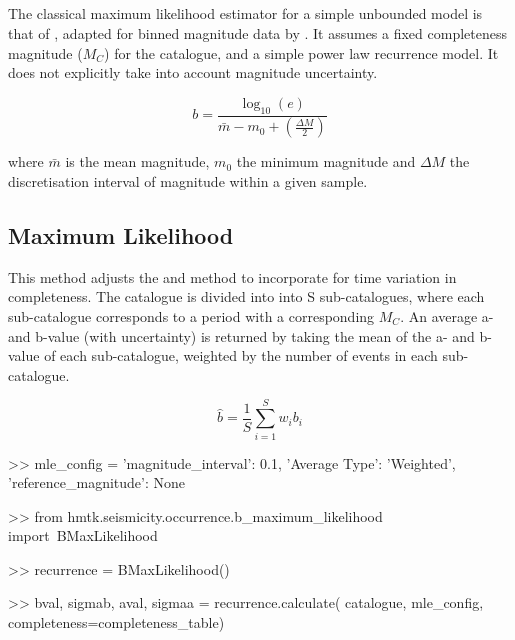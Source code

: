 \subsection{\textcite{Aki1965}}

The classical maximum likelihood estimator for a simple unbounded \textcite{GutenbergRichter1944} model is that of \textcite{Aki1965}, adapted for binned magnitude data by \textcite{Bender1983}. It assumes a fixed completeness magnitude ($M_C$) for the catalogue, and a simple power law recurrence model. It does not explicitly take into account magnitude uncertainty.

\begin{equation}
   b = \frac{ \log_{10} \left( e \right)}{ \bar{m} - m_0 + \left( {\frac{\Delta M}{2}} \right)}
\end{equation}

\noindent where $\bar{m}$ is the mean magnitude, $m_0$ the minimum magnitude and $\Delta M$ the discretisation interval of magnitude within a given sample.

\subsection{Maximum Likelihood}

This method adjusts the \textcite{Aki1965} and \textcite{Bender1983} method to incorporate for time variation in completeness. The catalogue is divided into
into S sub-catalogues, where each sub-catalogue corresponds to a period 
with a corresponding $M_C$.  An average a- and b-value (with uncertainty) is returned by taking 
the mean of the a- and b-value of each sub-catalogue, weighted by 
the number of events in each sub-catalogue.

\begin{equation}
   \hat{b} = \frac{1}{S} \sum_{i = 1}^{S} w_i b_i
\end{equation}

\begin{python}[frame=single]
>> mle_config = {'magnitude_interval': 0.1,
                 'Average Type': 'Weighted',
                 'reference_magnitude': None}

>> from hmtk.seismicity.occurrence.b_maximum_likelihood import\
    BMaxLikelihood

>> recurrence = BMaxLikelihood()

>> bval, sigmab, aval, sigmaa = recurrence.calculate(
    catalogue,
    mle_config, 
    completeness=completeness_table)
\end{python}

